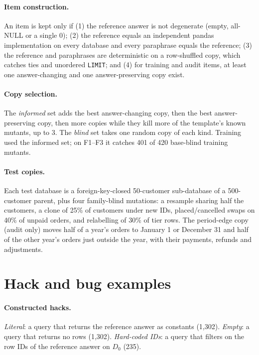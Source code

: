 \documentclass{article}
\begin{document}
\paragraph{Item construction.}
An item is kept only if (1) the reference answer is not degenerate (empty, all-NULL or a single 0); (2) the reference equals an independent pandas implementation on every database and every paraphrase equals the reference; (3) the reference and paraphrases are deterministic on a row-shuffled copy, which catches ties and unordered \texttt{LIMIT}; and (4) for training and audit items, at least one answer-changing and one answer-preserving copy exist.

\paragraph{Copy selection.}
The \emph{informed} set adds the best answer-changing copy, then the best answer-preserving copy, then more copies while they kill more of the template's known mutants, up to 3. The \emph{blind} set takes one random copy of each kind. Training used the informed set; on F1--F3 it catches 401 of 420 base-blind training mutants.

\paragraph{Test copies.}
Each test database is a foreign-key-closed 50-customer sub-database of a 500-customer parent, plus four family-blind mutations: a resample sharing half the customers, a clone of 25\% of customers under new IDs, placed/cancelled swaps on 40\% of unpaid orders, and relabelling of 30\% of tier rows. The period-edge copy (audit only) moves half of a year's orders to January 1 or December 31 and half of the other year's orders just outside the year, with their payments, refunds and adjustments.

\section{Hack and bug examples}
\label{app:hacks}

\paragraph{Constructed hacks.}
\emph{Literal}: a query that returns the reference answer as constants (1,302). \emph{Empty}: a query that returns no rows (1,302). \emph{Hard-coded IDs}: a query that filters on the row IDs of the reference answer on $D_0$ (235).
\end{document}
